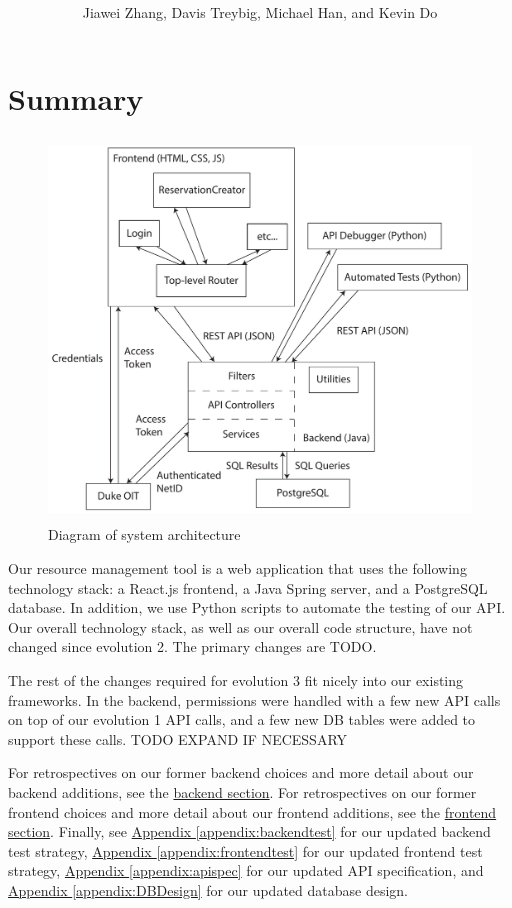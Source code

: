 \documentclass[12pt]{article}
\title{\horrule{5pt}\\\vspace{0.4cm}{\bf \mytitle}\\}
\author{Jiawei Zhang, Davis Treybig, Michael Han, and Kevin Do}
\date{\horrule{1pt}}
\begin{document}
\maketitle{}
\section{Summary}
\begin{figure}[h]
\begin{center}
\includegraphics[height=4in]{../ev2/ev2_design_cropped.pdf}
\end{center}
\caption{Diagram of system architecture}
\label{fig:design}
\end{figure}

Our resource management tool is a web application that uses the following technology stack: a React.js frontend, a Java Spring server, and a PostgreSQL database. In addition, we use Python scripts to automate the testing of our API. Our overall technology stack, as well as our overall code structure, have not changed since evolution 2. The primary changes are {\huge TODO}.

The rest of the changes required for evolution 3 fit nicely into our existing frameworks. In the backend, permissions were handled with a few new API calls on top of our evolution 1 API calls, and a few new DB tables were added to support these calls. {\huge TODO EXPAND IF NECESSARY}

For retrospectives on our former backend choices and more detail about our backend additions, see the \hyperref[sec:Backend]{backend section}. For retrospectives on our former frontend choices and more detail about our frontend additions, see the \hyperref[sec:Frontend]{frontend section}. Finally, see \hyperref[appendix:backendtest]{Appendix \ref{appendix:backendtest}} for our updated backend test strategy,  \hyperref[appendix:frontendtest]{Appendix \ref{appendix:frontendtest}} for our updated frontend test strategy, \hyperref[appendix:apispec]{Appendix \ref{appendix:apispec}} for our updated API specification, and \hyperref[appendix:DBDesign]{Appendix \ref{appendix:DBDesign}} for our updated database design. 
\end{document}
